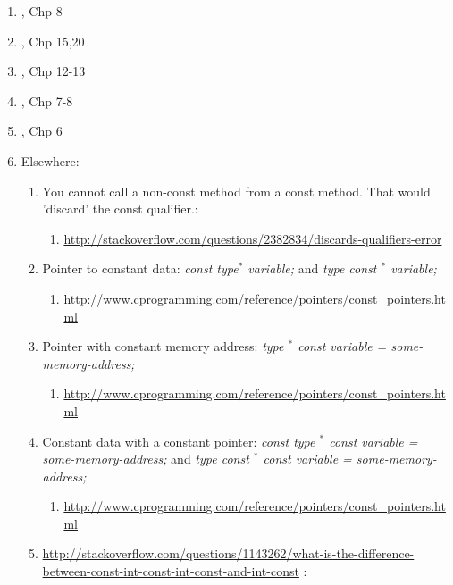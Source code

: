\begin{enumerate}
\begin{enumerate}
	\item \cite{Stroustrup2009}, Chp 8
	\item \cite{Oualline2003}, Chp 15,20
	\item \cite{Allain2012}, Chp 12-13
	\item \cite{Prata2012}, Chp 7-8
	\item \cite{Lippman2013}, Chp 6
	\item Elsewhere: \vspace{-0.2cm}
		\begin{enumerate} \itemsep -2pt
		\item You cannot call a non-const method from a const method. That would 'discard' the const qualifier.: \vspace{-0.1cm}
			\begin{enumerate} \itemsep -1pt
			\item \url{http://stackoverflow.com/questions/2382834/discards-qualifiers-error}
			\end{enumerate}
		\item Pointer to constant data: {\it const type$^{\ast}$ variable;} and {\it type const $^{\ast}$ variable;} \vspace{-0.1cm}
			\begin{enumerate} \itemsep -1pt
			\item \url{http://www.cprogramming.com/reference/pointers/const_pointers.html}
			\end{enumerate}
		\item Pointer with constant memory address: {\it type $^{\ast}$ const variable = some-memory-address;} \vspace{-0.1cm}
			\begin{enumerate} \itemsep -1pt
			\item \url{http://www.cprogramming.com/reference/pointers/const_pointers.html}
			\end{enumerate}
		\item Constant data with a constant pointer: {\it const type $^{\ast}$ const variable = some-memory-address;} and {\it type const $^{\ast}$ const variable = some-memory-address;} \vspace{-0.1cm}
			\begin{enumerate} \itemsep -1pt
			\item \url{http://www.cprogramming.com/reference/pointers/const_pointers.html}
			\end{enumerate}
		\item \url{http://stackoverflow.com/questions/1143262/what-is-the-difference-between-const-int-const-int-const-and-int-const} \cite{Mortensen2015}: \vspace{-0.1cm}

\end{enumerate}
\end{enumerate}
\end{enumerate}
